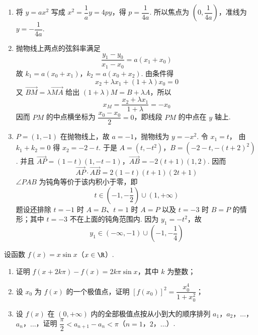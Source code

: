 \begin{solution}
\begin{enumerate}
\item 将 \(y=ax^2\) 写成 \(x^2=\dfrac1a y=4py\)，得 \(p=\dfrac1{4a}\).
所以焦点为 \(\left(0,\dfrac1{4a}\right)\)，准线为 \(y=-\dfrac1{4a}\).
\item 抛物线上两点的弦斜率满足
\[
\frac{y_1-y_0}{x_1-x_0}=a(x_1+x_0)
\]
故 \(k_1=a(x_0+x_1)\)，\(k_2=a(x_0+x_2)\). 由条件得
\[
x_2+\lambda x_1+(1+\lambda)x_0=0
\]
又 \(\overrightarrow{BM}=\lambda\overrightarrow{MA}\) 给出
\((1+\lambda)M=B+\lambda A\)，所以
\[
x_M=\frac{x_2+\lambda x_1}{1+\lambda}=-x_0
\]
因而 \(PM\) 的中点横坐标为 \(\dfrac{x_0-x_0}{2}=0\)，即线段 \(PM\) 的中点在
\(y\) 轴上.
\item \(P=(1,-1)\) 在抛物线上，故 \(a=-1\)，抛物线为 \(y=-x^2\). 令 \(x_1=t\)，
由 \(k_1+k_2=0\) 得 \(x_2=-2-t\). 于是
\(A=(t,-t^2)\)，\(B=(-2-t,-(t+2)^2)\).
并且
\(\overrightarrow{AP}=(1-t)(1,-t-1)\)，\(\overrightarrow{AB}=-2(t+1)(1,2)\).
因而
\[
\overrightarrow{AP}\cdot\overrightarrow{AB}
=2(1-t)(t+1)(2t+1)
\]
\(\angle PAB\) 为钝角等价于该内积小于零，即
\[
t\in\left(-1,-\frac12\right)\cup(1,+\infty)
\]
题设还排除 \(t=-1\) 时 \(A=B\)、\(t=1\) 时 \(A=P\) 以及 \(t=-3\) 时
\(B=P\) 的情形；其中 \(t=-3\) 不在上面的钝角范围内. 因为 \(y_1=-t^2\)，故
\[
y_1\in(-\infty,-1)\cup\left(-1,-\frac14\right)
\]
\end{enumerate}
\end{solution}

\begin{problem}
设函数 \(f(x)=x\sin x\)（\(x\in\R\)）.

\begin{enumerate}
\item 证明 \(f(x+2k\pi)-f(x)=2k\pi\sin x\)，其中 \(k\) 为整数；
\item 设 \(x_0\) 为 \(f(x)\) 的一个极值点，证明
\(\left[f(x_0)\right]^2=\dfrac{x_0^4}{1+x_0^2}\)；
\item 设 \(f(x)\) 在 \((0,+\infty)\) 内的全部极值点按从小到大的顺序排列
\(a_1\)，\(a_2\)，\(\ldots\)，\(a_n\)，\(\ldots\)，证明
\(\dfrac\pi2<a_{n+1}-a_n<\pi\)（\(n=1\)，\(2\)，\(\ldots\)）.
\end{enumerate}
\end{problem}

